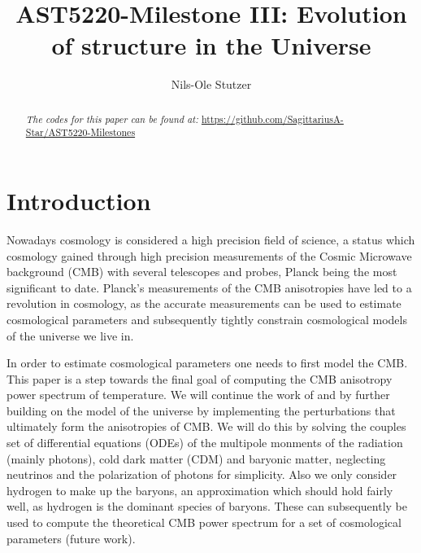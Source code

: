 \documentclass[twocolumn]{aastex62}
\begin{document}
\title{\Large AST5220-Milestone III: Evolution of structure in the Universe}

\author{Nils-Ole Stutzer}

\begin{abstract}
    
    \textit{The codes for this paper can be found at:} \newline \url{https://github.com/SagittariusA-Star/AST5220-Milestones}
\end{abstract}

\section{Introduction} \label{sec:Intro}
Nowadays cosmology is considered a high precision field of science, a status which cosmology gained through high precision measurements of the Cosmic Microwave background (CMB) with several telescopes and probes, Planck \citep[]{planckcollaboration:2018} being the most significant to date. Planck's measurements of the CMB anisotropies have led to a revolution in cosmology, as the accurate measurements can be used to estimate cosmological parameters and subsequently tightly constrain cosmological models of the universe we live in.

In order to estimate cosmological parameters one needs to first model the CMB. This paper is a step towards the final goal of computing the CMB anisotropy power spectrum of temperature. We will continue the work of \cite{stutzer:2020a} and \cite{stutzer:2020b} by further building on the model of the universe by implementing the perturbations that ultimately form the anisotropies of CMB. We will do this by solving the couples set of differential equations (ODEs) of the multipole monments of the radiation (mainly photons), cold dark matter (CDM) and baryonic matter, neglecting neutrinos and the polarization of photons for simplicity. Also we only consider hydrogen to make up the baryons, an approximation which should hold fairly well, as hydrogen is the dominant species of baryons. These can subsequently be used to compute the theoretical CMB power spectrum for a set of cosmological parameters (future work).
\end{document}

